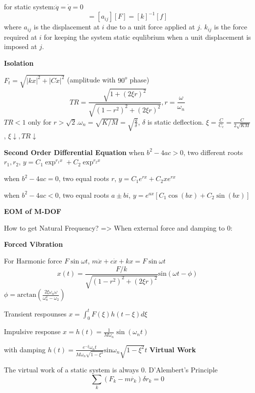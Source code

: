 \documentclass{article}
\begin{document}
\begin{multicols*}{3}
for static system:$\ddot{q}=\dot{q}=0$
\begin{equation*}
  [q]=[a_{ij}][F]=[k]^{-1}[f]
\end{equation*}
where $a_{ij}$ is the displacement at $i$ due to a unit force applied at $j$.
$k_{ij}$ is the force required at $i$ for keeping the system static equlibrium when a unit displacement is imposed at $j$.

\textbf{Isolation}

$F_{t}=\sqrt{|kx|^{2}+|C\dot{x}|^{2}}$ (amplitude with $90^{o}$ phase)
\begin{equation*}
  TR=\frac{\sqrt{1+(2\xi r)^{2}}}{\sqrt{(1-r^{2})^{2}+(2\xi r)^{2}}}, r=\frac{\omega}{\omega_{n}}
\end{equation*}
$TR<1$ only for $r> \sqrt{2}$.$\omega_{n}=\sqrt{K/M}=\sqrt{\frac{g}{\delta}}$, $\delta$ is static deflection.
$\xi=\frac{C}{C_{c}}=\frac{C}{2\sqrt{KM}}$, $\xi \downarrow, TR \downarrow$

\noindent\textbf{Second Order Differential Equation}
 when $b^2 - 4ac > 0$, two different roots $r_1, r_2$, $y = C_1\exp^{r_1 x} + C_2\exp^{r_2 x}$

  when $b^2 - 4ac = 0$, two equal roots $r$, $y = C_1 e^{r x} + C_2 x e^{r x}$
  
 when $b^2 - 4ac < 0$, two equal roots $a \pm bi$, $y = e^{ax} [C_1 \cos(b x) + C_2 \sin(b x)]$


  \noindent\textbf{EOM of M-DOF}

 How to get Natural Frequency? => When external force and damping to 0:


  \noindent\textbf{Forced Vibration}

 For Harmonic force $F\sin\omega t$, $m\ddot{x} + c\dot{x} + kx = F\sin\omega t$
\begin{equation*}
  x(t)=\frac{F/k}{\sqrt{(1-r^{2})^{2}+(2\xi r)^{2}}}\text{sin}(\omega t-\phi)
\end{equation*}
$\phi=\text{arctan}(\frac{2 \xi \omega_{n}\omega}{\omega_{n}^{2}-\omega_{2}})$
  
Transient respounses  $x = \int_0^t F(\xi) h(t-\xi) d\xi$

Impulsive response $x=h(t) = \frac{1}{M\omega_n}\sin(\omega_n t)$

with damping $h(t)=\frac{e^{-\xi}\omega_{n}t}{M\omega_{n}\sqrt{1-\xi^{2}}}\text{sin}\omega_{n}\sqrt{1-\xi^{2}}t$
  \noindent\textbf{Virtual Work}

 The virtual work of a static system is always 0.
  D'Alembert's Principle
    \begin{equation*}
      \sum_k (F_k - m \ddot{r_k}) \delta r_k = 0
    \end{equation*}


\end{multicols*}
\end{document}
